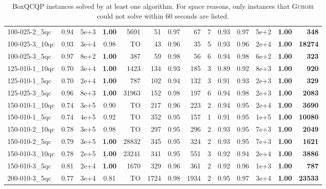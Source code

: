 \documentclass[twoside]{article}
\begin{document}
\begin{table}[h!]
{\begin{tabular}{l|crcr|rcrrccrcr}
				100-025-2\_5qc & 0.94 & 5e+3 & \textbf{1.00} & 5691 & 51 & 0.97 & 67 & 7 & 0.93 & 0.97 & 5e+2 & \textbf{1.00} & \textbf{348} \\
				100-025-3\_10qc & 0.93 & 3e+4 & 0.98 & TO & 43 & 0.96 & 35 & 5 & 0.93 & 0.96 & 2e+4 & \textbf{1.00} & \textbf{18274} \\
				100-025-3\_5qc & 0.97 & 8e+2 & \textbf{1.00} & 387 & 59 & 0.98 & 56 & 6 & 0.94 & 0.98 & 6e+2 & \textbf{1.00} & \textbf{323} \\
				125-010-1\_10qc & 0.70 & 3e+4 & \textbf{1.00} & 1423 & 134 & 0.93 & 185 & 3 & 0.89 & 0.92 & 8e+3 & \textbf{1.00} & \textbf{920} \\
				125-010-1\_5qc & 0.70 & 2e+4 & \textbf{1.00} & 787 & 102 & 0.94 & 132 & 3 & 0.91 & 0.93 & 2e+3 & \textbf{1.00} & \textbf{329} \\
				125-025-3\_5qc & 0.96 & 8e+3 & \textbf{1.00} & 31963 & 152 & 0.98 & 197 & 6 & 0.94 & 0.98 & 2e+3 & \textbf{1.00} & \textbf{2083} \\
				150-010-1\_10qc & 0.74 & 3e+5 & 0.90 & TO & 217 & 0.96 & 223 & 2 & 0.94 & 0.95 & 2e+4 & \textbf{1.00} & \textbf{3690} \\
				150-010-1\_5qc & 0.74 & 4e+5 & 0.92 & TO & 352 & 0.95 & 157 & 1 & 0.91 & 0.95 & 1e+5 & \textbf{1.00} & \textbf{10080} \\
				150-010-2\_10qc & 0.78 & 3e+5 & 0.98 & TO & 297 & 0.95 & 296 & 2 & 0.93 & 0.95 & 7e+3 & \textbf{1.00} & \textbf{2049} \\
				150-010-2\_5qc & 0.79 & 3e+5 & \textbf{1.00} & 28832 & 345 & 0.95 & 324 & 2 & 0.93 & 0.95 & 7e+3 & \textbf{1.00} & \textbf{1621} \\
				150-010-3\_10qc & 0.78 & 2e+5 & \textbf{1.00} & 23241 & 341 & 0.95 & 551 & 3 & 0.92 & 0.94 & 2e+4 & \textbf{1.00} & \textbf{3886} \\
				150-010-3\_5qc & 0.81 & 2e+4 & \textbf{1.00} & 1670 & 329 & 0.96 & 361 & 2 & 0.92 & 0.96 & 1e+3 & \textbf{1.00} & \textbf{787} \\
				200-010-3\_5qc & 0.77 & 3e+4 & 0.81 & TO & 1724 & 0.98 & 1934 & 2 & 0.95 & 0.97 & 3e+4 & \textbf{1.00} & \textbf{23533} \\
				
				\bottomrule
		\end{tabular}}
		\caption{BoxQCQP instances solved by at least one algorithm. For space
			reasons, only instances that \textsc{Gurobi} could not solve within 60 seconds
			are listed.}
		\label{tab:solvedBQP}
	\end{table}
	
\end{document}
